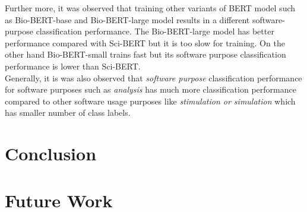 Further more, it was observed that training other variants of BERT model such as Bio-BERT-base and Bio-BERT-large model results in a different software-purpose classification performance. The Bio-BERT-large model has better performance compared with Sci-BERT but it is too slow for training. On the other hand Bio-BERT-small trains fast but its software purpose classification performance is lower than Sci-BERT. \\


Generally, it is was also observed that \emph{software purpose} classification performance for software purposes such as \emph{analysis} has much more classification performance compared to other software usage purposes like \emph{stimulation or simulation} which has smaller number of class labels.   


\section{Conclusion}
\label{sec:chapter07:Conclusion}


\section{Future Work}
\label{sec:chapter07:futurework}


